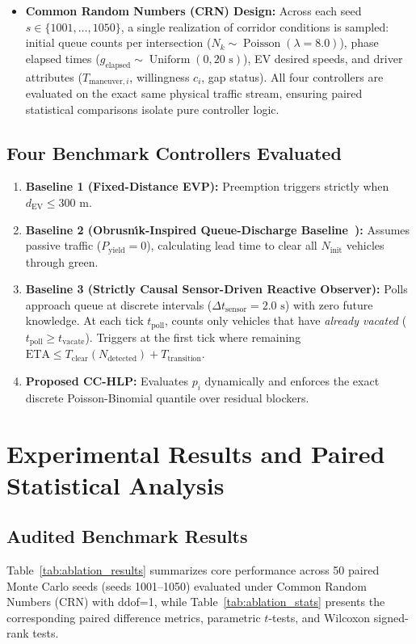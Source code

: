 \documentclass[journal,10pt,twocolumn]{IEEEtran}
\begin{document}
\begin{itemize}
\begin{itemize}
    \end{itemize}
    \item \textbf{Common Random Numbers (CRN) Design:} Across each seed $s \in \{1001, \dots, 1050\}$, a single realization of corridor conditions is sampled: initial queue counts per intersection ($N_k \sim \operatorname{Poisson}(\lambda=8.0)$), phase elapsed times ($g_{\text{elapsed}} \sim \operatorname{Uniform}(0, 20\text{ s})$), EV desired speeds, and driver attributes ($T_{\text{maneuver}, i}$, willingness $c_i$, gap status). All four controllers are evaluated on the exact same physical traffic stream, ensuring paired statistical comparisons isolate pure controller logic.
\end{itemize}

\subsection{Four Benchmark Controllers Evaluated}
\begin{enumerate}
    \item \textbf{Baseline 1 (Fixed-Distance EVP):} Preemption triggers strictly when $d_{\text{EV}} \le 300\text{ m}$.
    \item \textbf{Baseline 2 (Obrusn\'{\i}k-Inspired Queue-Discharge Baseline~\cite{obrusnik2020}):} Assumes passive traffic ($P_{\text{yield}} = 0$), calculating lead time to clear all $N_{\text{init}}$ vehicles through green.
    \item \textbf{Baseline 3 (Strictly Causal Sensor-Driven Reactive Observer):} Polls approach queue at discrete intervals ($\Delta t_{\text{sensor}} = 2.0\text{ s}$) with zero future knowledge. At each tick $t_{\text{poll}}$, counts only vehicles that have \emph{already vacated} ($t_{\text{poll}} \ge t_{\text{vacate}}$). Triggers at the first tick where remaining $\text{ETA} \le T_{\text{clear}}(N_{\text{detected}}) + T_{\text{transition}}$.
    \item \textbf{Proposed CC-HLP:} Evaluates $p_i$ dynamically and enforces the exact discrete Poisson-Binomial quantile over residual blockers.
\end{enumerate}

\section{Experimental Results and Paired Statistical Analysis}
\label{sec:results}

\subsection{Audited Benchmark Results}
Table~\ref{tab:ablation_results} summarizes core performance across 50 paired Monte Carlo seeds (seeds 1001--1050) evaluated under Common Random Numbers (CRN) with ddof=1, while Table~\ref{tab:ablation_stats} presents the corresponding paired difference metrics, parametric $t$-tests, and Wilcoxon signed-rank tests.
\end{document}
